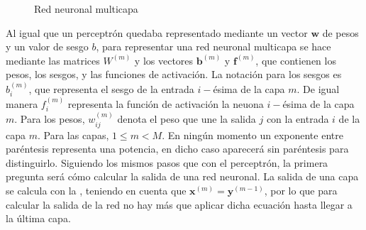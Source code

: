 \begin{figure}
{
			}
			\caption{Red neuronal multicapa}
			\label{fig:rna_completa}
		\end{figure}
		
		Al igual que un perceptrón quedaba representado mediante un vector $\textbf{w}$ de pesos y un valor de sesgo $b$, para representar una red neuronal multicapa se hace mediante las matrices $W^{(m)}$ y los vectores $\textbf{b}^{(m)}$ y $\textbf{f}^{(m)}$, que contienen los pesos, los sesgos, y las funciones de activación. La notación para los sesgos es $b_i^{(m)}$, que representa el sesgo de la entrada $i-$ésima de la capa $m$. De igual manera $f_i^{(m)}$ representa la función de activación la neuona $i-$ésima de la capa $m$. Para los pesos, $w_{ij}^{(m)}$ denota el peso que une la salida $j$ con la entrada $i$ de la capa $m$. Para las capas, $1 \leq m < M$. En ningún momento un exponente entre paréntesis representa una potencia, en dicho caso aparecerá sin paréntesis para distinguirlo. Siguiendo los mismos pasos que con el perceptrón, la primera pregunta será cómo calcular la salida de una red neuronal. La salida de una capa se calcula con la , teniendo en cuenta que $\textbf{x}^{(m)} = \textbf{y}^{(m-1)}$, por lo que para calcular la salida de la red no hay más que aplicar dicha ecuación hasta llegar a la última capa. 
		
